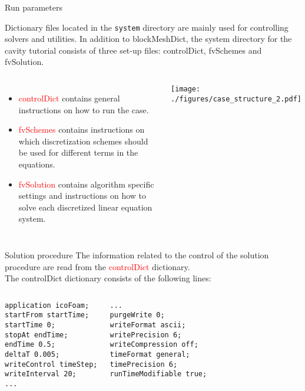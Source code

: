 \documentclass{beamer}
\begin{document}
\begin{frame}{Run parameters}

Dictionary files located in the \texttt{system} directory are mainly used for controlling solvers and utilities.
In addition to blockMeshDict, the system directory for the cavity tutorial consists of three set-up files: controlDict, fvSchemes and fvSolution.

\begin{columns}
\column{7.0cm} 
\begin{itemize}
\item \textcolor{red}{controlDict} contains general instructions on how to run the case.
\item \textcolor{red}{fvSchemes} contains instructions on which discretization schemes should be used for different terms in the equations.
\item \textcolor{red}{fvSolution} contains algorithm specific settings and instructions on how to solve each discretized linear equation system.
\end{itemize}
\vspace{-0.2cm}
\column{4.0cm} 
\begin{center}\texttt{[image: ./figures/case\_structure\_2.pdf]}\end{center}
\end{columns}

\end{frame}

\begin{frame}[fragile]{Solution procedure}
The information related to the control of the solution procedure are read from the \textcolor{red}{controlDict} dictionary.\\[0.2cm]

The controlDict dictionary consists of the following lines:
\begin{columns}
\column{5.5cm} 
\begin{small}
\begin{verbatim}
application icoFoam;
startFrom startTime;
startTime 0;
stopAt endTime;
endTime 0.5;
deltaT 0.005;
writeControl timeStep;
writeInterval 20;
...
\end{verbatim}
\end{small}
\column{6.0cm} 
\begin{small}
\begin{verbatim}
...
purgeWrite 0;
writeFormat ascii;
writePrecision 6;
writeCompression off;
timeFormat general;
timePrecision 6;
runTimeModifiable true;
\end{verbatim}
\end{small}
\end{columns}

\end{frame}
\end{document}
